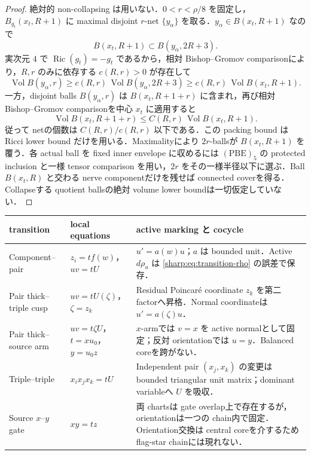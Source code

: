 \documentclass[a4paper,11pt]{ltjsarticle}
\numberwithin{equation}{section}
\theoremstyle{plain}
\theoremstyle{definition}
\theoremstyle{remark}
\newcommand{\Ric}{\operatorname{Ric}}\newcommand{\tr}{\operatorname{tr}}\newcommand{\osc}{\operatorname{osc}}\newcommand{\vol}{\operatorname{Vol}}
\begin{document}
\begin{proof}
絶対的 non-collapsing は用いない．$0<r<\rho/8$ を固定し，$B_{g_t}(x_t,R+1)$ に maximal disjoint $r$-net $\{y_\alpha\}$ を取る．$y_\alpha\in B(x_t,R+1)$ なので
\[
 B(x_t,R+1)\subset B(y_\alpha,2R+3).
\]
実次元 $4$ で $\Ric(g_t)=-g_t$ であるから，相対 Bishop--Gromov comparisonにより，$R,r$ のみに依存する $c(R,r)>0$ が存在して
\[
 \vol B(y_\alpha,r)
 \ge c(R,r)\,\vol B(y_\alpha,2R+3)
 \ge c(R,r)\,\vol B(x_t,R+1).
\]
一方，disjoint balls $B(y_\alpha,r)$ は $B(x_t,R+1+r)$ に含まれ，再び相対 Bishop--Gromov comparisonを中心 $x_t$ に適用すると
\[
 \vol B(x_t,R+1+r)
 \le C(R,r)\,\vol B(x_t,R+1).
\]
従って netの個数は $C(R,r)/c(R,r)$ 以下である．この packing bound は Ricci lower bound だけを用いる．Maximalityにより $2r$-ballsが $B(x_t,R+1)$ を覆う．各 actual ball を fixed inner envelope に収めるには $\mathrm{(PBE)}_5$ の protected inclusion と一様 tensor comparison を用い，$2r$ をその一様半径以下に選ぶ．Ball $B(x_t,R)$ と交わる nerve componentだけを残せば connected coverを得る．Collapseする quotient ballsの絶対 volume lower boundは一切仮定していない．
\end{proof}

\begin{center}
\small
\begin{tabularx}{\textwidth}{@{}p{}p{}X@{}}
\toprule
transition & local equations & active marking と cocycle \\
\midrule
Component--pair
 & $z_i=t f(w)$，$uv=tU$
 & $u'=a(w)u$；$a$ は bounded unit．Active $d\rho_u$ は \eqref{sharp:eq:transition-rho} の誤差で保存．\\[1mm]
Pair thick--triple cusp
 & $uv=tU(\zeta)$，$\zeta=z_k$
 & Residual Poincar\'e coordinate $z_k$ を第二 factorへ昇格．Normal coordinateは $u'=a(\zeta)u$．\\[1mm]
Pair thick--source arm
 & $uv=t\zeta U$，$t=xu_0$，$y=u_0z$
 & $x$-armでは $v=x$ を active normalとして固定；反対 orientationでは $u=y$．Balanced coreを跨がない．\\[1mm]
Triple--triple
 & $x_ix_jx_k=tU$
 & Independent pair $(x_j,x_k)$ の変更は bounded triangular unit matrix；dominant variableへ $U$ を吸収．\\[1mm]
Source $x$--$y$ gate
 & $xy=tz$
 & 両 chartsは gate overlap上で存在するが，orientationは一つの chain内で固定．Orientation交換は central coreを介するため flag-star chainには現れない．\\
\bottomrule
\end{tabularx}
\end{center}
\end{document}
